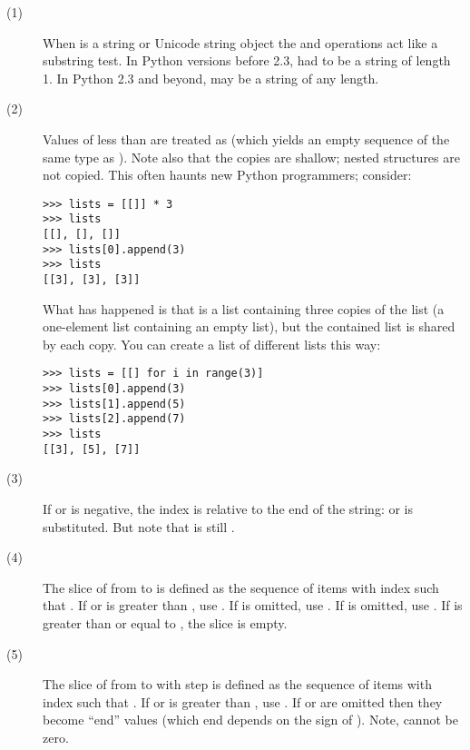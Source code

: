 \begin{description}
\item[(1)] When  is a string or Unicode string object the
 and  operations act like a substring test.  In
Python versions before 2.3,  had to be a string of length 1.
In Python 2.3 and beyond,  may be a string of any length.

\item[(2)] Values of  less than  are treated as
   (which yields an empty sequence of the same type as
  ).  Note also that the copies are shallow; nested structures
  are not copied.  This often haunts new Python programmers; consider:

\begin{verbatim}
>>> lists = [[]] * 3
>>> lists
[[], [], []]
>>> lists[0].append(3)
>>> lists
[[3], [3], [3]]
\end{verbatim}

  What has happened is that  is a list containing three
  copies of the list \code{[[]]} (a one-element list containing an
  empty list), but the contained list is shared by each copy.  You can
  create a list of different lists this way:

\begin{verbatim}
>>> lists = [[] for i in range(3)]
>>> lists[0].append(3)
>>> lists[1].append(5)
>>> lists[2].append(7)
>>> lists
[[3], [5], [7]]
\end{verbatim}

\item[(3)] If  or  is negative, the index is relative to
  the end of the string:  or
   is substituted.  But note that  is
  still .

\item[(4)] The slice of  from  to  is defined as
  the sequence of items with index  such that .  If  or  is greater than
  , use .  If  is omitted,
  use .  If  is omitted, use .  If
   is greater than or equal to , the slice is empty.

\item[(5)] The slice of  from  to  with step
   is defined as the sequence of items with index 
   such that 
  \code{<=}  \code{<} .  If  or 
  is greater than , use .  If
   or  are omitted then they become ``end'' values
  (which end depends on the sign of ).  Note,  cannot
  be zero.

\end{description}


